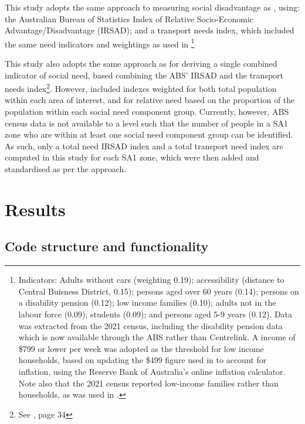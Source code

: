 \documentclass[preprint, 3p,
authoryear]{elsarticle} %
\begin{document}
This study adopts the same approach to measuring social disadvantage as
\citet{currie2010identifying}, using: the Australian Bureau of
Statistics Index of Relative Socio-Economic Advantage/Disadvantage
(IRSAD); and a transport needs index, which included the same need
indicators and weightings as used in
\citet{currie2010identifying}\footnote{Indicators: Adults without cars
  (weighting 0.19); accessibility (distance to Central Buisness
  District, 0.15); persons aged over 60 years (0.14); persons on a
  disability pension (0.12); low income families (0.10); adults not in
  the labour force (0.09); students (0.09); and persons aged 5-9 years
  (0.12). Data was extracted from the 2021 census, including the
  disability pension data which is now available through the ABS rather
  than Centrelink. A income of \$799 or lower per week was adopted as
  the threshold for low income households, based on updating the \$499
  figure used in \citet{currie2010identifying} to account for inflation,
  using the Reserve Bank of Australia's online inflation calculator.
  Note also that the 2021 census reported low-income families rather
  than households, as was used in \citet{currie2010identifying}.}

This study also adopts the same approach as
\citet{currie2010identifying} for deriving a single combined indicator
of social need, based combining the ABS' IRSAD and the transport needs
index\footnote{See \citet{currie2010identifying}, page 34}. However,
\citet{currie2010identifying} included indexes weighted for both total
population within each area of interest, and for relative need based on
the proportion of the population within each social need component
group. Currently, however, ABS census data is not available to a level
such that the number of people in a SA1 zone who are within at least one
social need component group can be identified. As such, only a total
need IRSAD index and a total transport need index are computed in this
study for each SA1 zone, which were then added and standardised as per
the \citet{currie2010identifying} approach.

\section{Results}\label{results}

\subsection{Code structure and
functionality}\label{code-structure-and-functionality}
\end{document}
